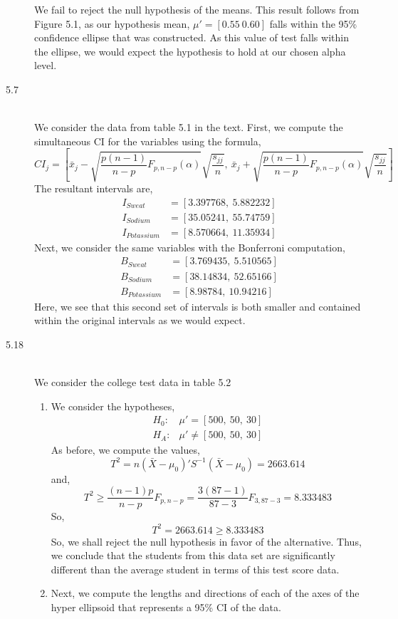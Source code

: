 \documentclass[letterpaper,10pt]{article}
\begin{document}
\begin{description}
We fail to reject the null hypothesis of the means. This result follows from Figure 5.1, as our hypothesis mean, $\mu'=[0.55\ 0.60]$ falls within the 95\% confidence ellipse that was constructed. As this value of test falls within the ellipse, we would expect the hypothesis to hold at our chosen alpha level.
\item[5.7]\hfill\\
We consider the data from table 5.1 in the text. First, we compute the simultaneous CI for the variables using the formula,
\[CI_j=\left[\bar{x}_j-\sqrt{\frac{p(n-1)}{n-p}F_{p,n-p}(\alpha)}\sqrt{\frac{s_{jj}}{n}},\ \bar{x}_j+\sqrt{\frac{p(n-1)}{n-p}F_{p,n-p}(\alpha)}\sqrt{\frac{s_{jj}}{n}}\right]\]
The resultant intervals are,
\begin{align*}
I_{Sweat} &=[3.397768,\ 5.882232]\\
I_{Sodium} &=[35.05241,\ 55.74759]\\
I_{Potassium} &=[8.570664,\ 11.35934]
\end{align*}
Next, we consider the same variables with the Bonferroni computation,
\begin{align*}
B_{Sweat} &=[3.769435,\ 5.510565]\\
B_{Sodium} &=[38.14834,\ 52.65166]\\
B_{Potassium} &=[8.98784,\ 10.94216]
\end{align*}
Here, we see that this second set of intervals is both smaller and contained within the original intervals as we would expect.
\item[5.18]\hfill\\
We consider the college test data in table 5.2
\begin{enumerate}
\item We consider the hypotheses,
\begin{align*}
H_0:& \mu'=[500,\ 50,\ 30]\\
H_A:& \mu'\neq [500,\ 50,\ 30]
\end{align*}
As before, we compute the values,
\[T^2=n(\bar{X}-\mu_0)'S^{-1}(\bar{X}-\mu_0)=2663.614\]
and,
\[T^2\geq \frac{(n-1)p}{n-p}F_{p,n-p}=\frac{3(87-1)}{87-3}F_{3,87-3}=8.333483\]
So,
\[T^2=2663.614\geq8.333483\]
So, we shall reject the null hypothesis in favor of the alternative. Thus, we conclude that the students from this data set are significantly different than the average student in terms of this test score data.
\item Next, we compute the lengths and directions of each of the axes of the hyper ellipsoid that represents a 95\% CI of the data.

\end{enumerate}
\end{description}
\end{document}
